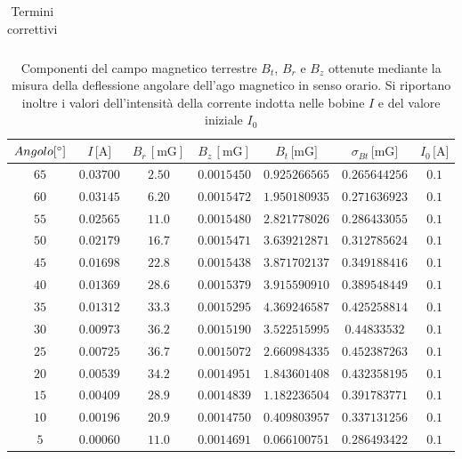 \documentclass[]{article}
\begin{document}
\begin{table}
\begin{tabular}{||c|c||}
\end{tabular}
\caption{Termini correttivi}
\label{termine_correttivo}
\end{table}


\begin{table}
    \centering


\begin{tabular}{||c|c|c|c|c|c|c||}
    \hline
    $Angolo [\text{\degree}] $ & $I\, \text{[A]} $ & $B_r\, [\text{mG}] $ & $B_z\, [\text{mG}] $ & $B_t\, \text{[mG]} $ & $ \sigma_{Bt} \, \text{[mG]} $ & $I_0\, \text{[A]} $\\
    \hline\hline

    $65$ & $0.03700$ & $2.50$ & $0.0015450$ & $0.925266565$ & $0.265644256$ & $0.1$ \\\hline
    $60$ & $0.03145$ & $6.20$ & $0.0015472$ & $1.950180935$ & $0.271636923$ & $0.1$ \\\hline
    $55$ & $0.02565$ & $11.0$ & $0.0015480$ & $2.821778026$ & $0.286433055$ & $0.1$ \\\hline
    $50$ & $0.02179$ & $16.7$ & $0.0015471$ & $3.639212871$ & $0.312785624$ & $0.1$ \\\hline
    $45$ & $0.01698$ & $22.8$ & $0.0015438$ & $3.871702137$ & $0.349188416$ & $0.1$ \\\hline
    $40$ & $0.01369$ & $28.6$ & $0.0015379$ & $3.915590910$ & $0.389548449$ & $0.1$ \\\hline
    $35$ & $0.01312$ & $33.3$ & $0.0015295$ & $4.369246587$ & $0.425258814$ & $0.1$ \\\hline
    $30$ & $0.00973$ & $36.2$ & $0.0015190$ & $3.522515995$ & $0.44833532$  & $0.1$ \\\hline
    $25$ & $0.00725$ & $36.7$ & $0.0015072$ & $2.660984335$ & $0.452387263$ & $0.1$ \\\hline
    $20$ & $0.00539$ & $34.2$ & $0.0014951$ & $1.843601408$ & $0.432358195$ & $0.1$ \\\hline
    $15$ & $0.00409$ & $28.9$ & $0.0014839$ & $1.182236504$ & $0.391783771$ & $0.1$ \\\hline
    $10$ & $0.00196$ & $20.9$ & $0.0014750$ & $0.409803957$ & $0.337131256$ & $0.1$ \\\hline
    $5 $ & $0.00060$ & $11.0$ & $0.0014691$ & $0.066100751$ & $0.286493422$ & $0.1$ \\\hline

\end{tabular}
\caption{Componenti del campo magnetico terrestre $B_t$, $B_r$ e $B_z$ ottenute mediante la misura della deflessione angolare dell'ago magnetico in senso orario. Si riportano inoltre i valori dell'intensità della corrente indotta nelle bobine $I$ e del valore iniziale $I_0$}
\label{campomagneticoterrestre_sensoorario}
\end{table}
\end{document}
